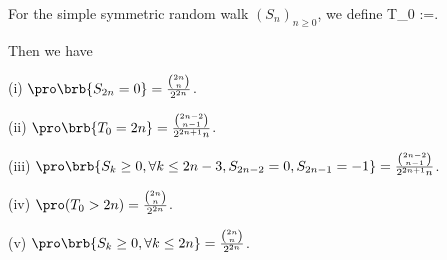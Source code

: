 \begin{proposition}
For the simple symmetric random walk $(S_n)_{n\geq 0}$, we define
\be
T_0 :=\inf{}.
\ee

Then we have
\ben
\item [(i)] $\pro\brb{S_{2n}=0} =  \frac{\binom{2n}{n}}{2^{2n}}$.
\item [(ii)] $\pro\brb{T_0 = 2n} = \frac{\binom{2n-2}{n-1}}{2^{2n+1}n}$.
\item [(iii)] $\pro\brb{S_k\geq 0,\forall k\leq 2n-3, S_{2n-2} =0, S_{2n-1}=-1} = \frac{\binom{2n-2}{n-1}}{2^{2n+1}n}$.
\item [(iv)] $\pro(T_0>2n) = \frac{\binom{2n}{n}}{2^{2n}}$.
\item [(v)] $\pro\brb{S_k\geq 0, \forall k\leq 2n} = \frac{\binom{2n}{n}}{2^{2n}}$.
\een
\end{proposition}

